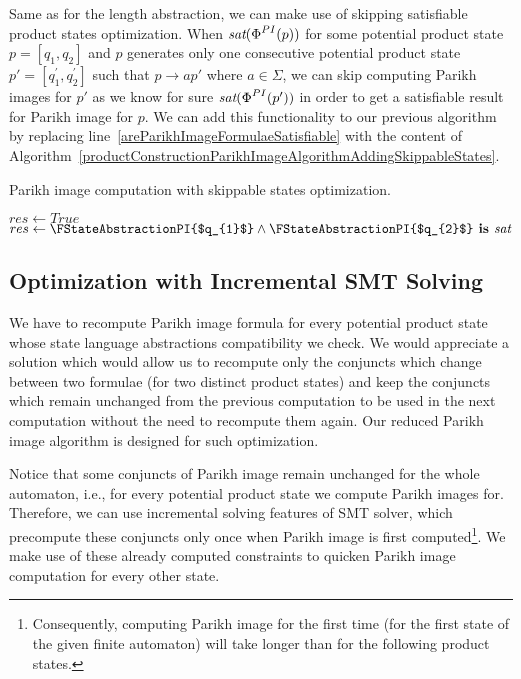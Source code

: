 Same as for the length abstraction, we can make use of skipping satisfiable product states optimization. When $\emph{sat}(\emph{$\Phi$}^{PI}(p))$ for some potential product state $p = [q_1, q_2]$ and $p$ generates only one consecutive potential product state $p' = [q^{'}_1, q^{'}_2]$ such that $p \rightarrow{a} p'$ where $ a \in \Sigma $, we can skip computing Parikh images for $p'$ as we know for sure $\emph{sat}(\emph{$\Phi$}^{PI}(p'))$ in order to get a satisfiable result for Parikh image for $p$. We can add this functionality to our previous algorithm by replacing line~\ref{areParikhImageFormulaeSatisfiable} with the content of Algorithm~\ref{productConstructionParikhImageAlgorithmAddingSkippableStates}.

\begin{algorithm}
\caption{Parikh image computation with skippable states optimization.}\label{productConstructionParikhImageAlgorithmAddingSkippableStates}
\DontPrintSemicolon
\BlankLine
    \eIf{$\FIsSkippable{$[q_1, q_2]$}$} {
        $res \gets True$ \;
    } { %
        $res \gets \FStateAbstractionPI{$q_{1}$} \land \FStateAbstractionPI{$q_{2}$} \textbf{ is } \emph{sat} $ \;
    }
\end{algorithm}

\subsection{Optimization with Incremental SMT Solving}

We have to recompute Parikh image formula for every potential product state whose state language abstractions compatibility we check. We would appreciate a solution which would allow us to recompute only the conjuncts which change between two formulae (for two distinct product states) and keep the conjuncts which remain unchanged from the previous computation to be used in the next computation without the need to recompute them again. Our reduced Parikh image algorithm is designed for such optimization.

Notice that some conjuncts of Parikh image remain unchanged for the whole automaton, i.e., for every potential product state we compute Parikh images for. Therefore, we can use incremental solving features of SMT solver, which precompute these conjuncts only once when Parikh image is first computed\footnote{Consequently, computing Parikh image for the first time (for the first state of the given finite automaton) will take longer than for the following product states.}. We make use of these already computed constraints to quicken Parikh image computation for every other state.

